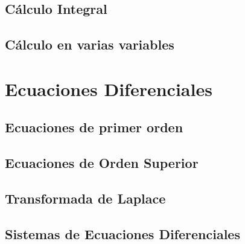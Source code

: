 \documentclass[
]{tufte-book}
\begin{document}
\chapter{Cálculo Integral}
	








\chapter{Cálculo en varias variables}



\part{Ecuaciones Diferenciales}

\chapter{Ecuaciones de primer orden}





\chapter{Ecuaciones de Orden Superior}








\chapter{Transformada de Laplace}






\chapter{Sistemas de Ecuaciones Diferenciales}




%
{}

\end{document}
